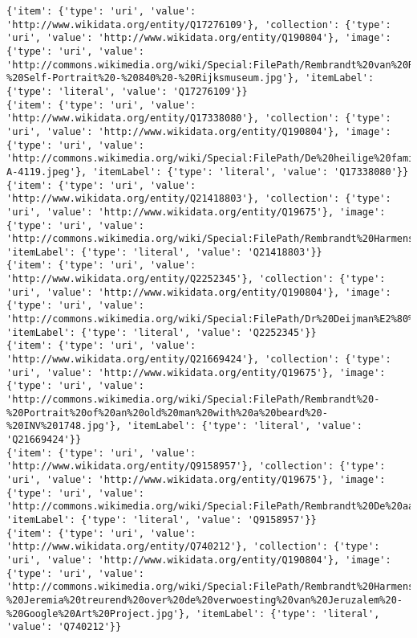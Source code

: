 \documentclass[
  letterpaper,
]{book}
\begin{document}
\begin{verbatim}
{'item': {'type': 'uri', 'value': 'http://www.wikidata.org/entity/Q17276109'}, 'collection': {'type': 'uri', 'value': 'http://www.wikidata.org/entity/Q190804'}, 'image': {'type': 'uri', 'value': 'http://commons.wikimedia.org/wiki/Special:FilePath/Rembrandt%20van%20Rijn%20-%20Self-Portrait%20-%20840%20-%20Rijksmuseum.jpg'}, 'itemLabel': {'type': 'literal', 'value': 'Q17276109'}}
{'item': {'type': 'uri', 'value': 'http://www.wikidata.org/entity/Q17338080'}, 'collection': {'type': 'uri', 'value': 'http://www.wikidata.org/entity/Q190804'}, 'image': {'type': 'uri', 'value': 'http://commons.wikimedia.org/wiki/Special:FilePath/De%20heilige%20familie%20bij%20avond%20Rijksmuseum%20SK-A-4119.jpeg'}, 'itemLabel': {'type': 'literal', 'value': 'Q17338080'}}
{'item': {'type': 'uri', 'value': 'http://www.wikidata.org/entity/Q21418803'}, 'collection': {'type': 'uri', 'value': 'http://www.wikidata.org/entity/Q19675'}, 'image': {'type': 'uri', 'value': 'http://commons.wikimedia.org/wiki/Special:FilePath/Rembrandt%20Harmensz.%20van%20Rijn%20081.jpg'}, 'itemLabel': {'type': 'literal', 'value': 'Q21418803'}}
{'item': {'type': 'uri', 'value': 'http://www.wikidata.org/entity/Q2252345'}, 'collection': {'type': 'uri', 'value': 'http://www.wikidata.org/entity/Q190804'}, 'image': {'type': 'uri', 'value': 'http://commons.wikimedia.org/wiki/Special:FilePath/Dr%20Deijman%E2%80%99s%20Anatomy%20Lesson%20%28fragment%29%2C%20by%20Rembrandt.jpg'}, 'itemLabel': {'type': 'literal', 'value': 'Q2252345'}}
{'item': {'type': 'uri', 'value': 'http://www.wikidata.org/entity/Q21669424'}, 'collection': {'type': 'uri', 'value': 'http://www.wikidata.org/entity/Q19675'}, 'image': {'type': 'uri', 'value': 'http://commons.wikimedia.org/wiki/Special:FilePath/Rembrandt%20-%20Portrait%20of%20an%20old%20man%20with%20a%20beard%20-%20INV%201748.jpg'}, 'itemLabel': {'type': 'literal', 'value': 'Q21669424'}}
{'item': {'type': 'uri', 'value': 'http://www.wikidata.org/entity/Q9158957'}, 'collection': {'type': 'uri', 'value': 'http://www.wikidata.org/entity/Q19675'}, 'image': {'type': 'uri', 'value': 'http://commons.wikimedia.org/wiki/Special:FilePath/Rembrandt%20De%20aartsengel%20verlaat%20Tobias%20en%20zijn%20gezin.%201637.jpg'}, 'itemLabel': {'type': 'literal', 'value': 'Q9158957'}}
{'item': {'type': 'uri', 'value': 'http://www.wikidata.org/entity/Q740212'}, 'collection': {'type': 'uri', 'value': 'http://www.wikidata.org/entity/Q190804'}, 'image': {'type': 'uri', 'value': 'http://commons.wikimedia.org/wiki/Special:FilePath/Rembrandt%20Harmensz.%20van%20Rijn%20-%20Jeremia%20treurend%20over%20de%20verwoesting%20van%20Jeruzalem%20-%20Google%20Art%20Project.jpg'}, 'itemLabel': {'type': 'literal', 'value': 'Q740212'}}

\end{verbatim}
\end{document}
